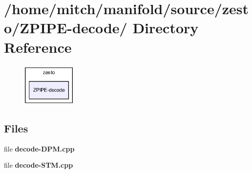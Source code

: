 \section{/home/mitch/manifold/source/zesto/ZPIPE-decode/ Directory Reference}
\label{dir_55c5809854b2cb7d1d4855f3317f0832}


\nopagebreak
\begin{figure}[H]
\begin{center}
\leavevmode
\includegraphics[width=78pt]{dir_55c5809854b2cb7d1d4855f3317f0832_dep}
\end{center}
\end{figure}
\subsection*{Files}
\begin{CompactItemize}
\item 
file {\bf decode-DPM.cpp}
\item 
file {\bf decode-STM.cpp}
\end{CompactItemize}
